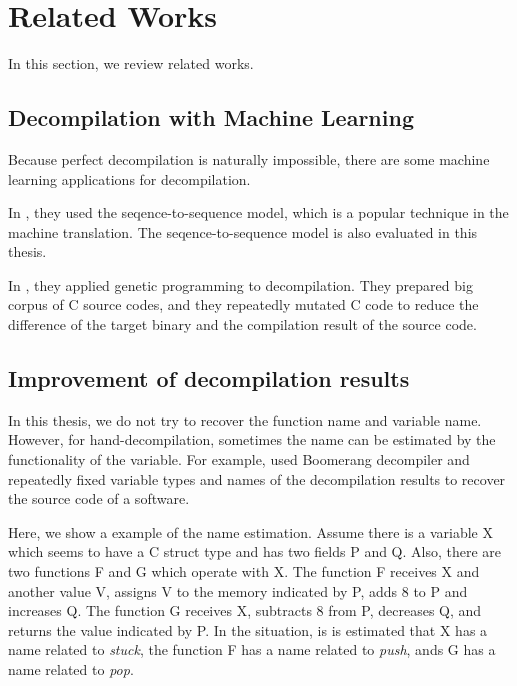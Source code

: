 \documentclass[senior,final,11pt]{iscs-thesis}
\begin{document}

\chapter{Related Works}
In this section, we review related works.

\section{Decompilation with Machine Learning}

Because perfect decompilation is naturally impossible, there are some machine learning applications for decompilation.

In \cite{Motoneta}, they used the seqence-to-sequence model, which is a popular technique in the machine translation.
The seqence-to-sequence model is also evaluated in this thesis.

In \cite{genetic_decompiler}, they applied genetic programming to decompilation.
They prepared big corpus of C source codes, and they repeatedly mutated C code to reduce the difference of the target binary and the compilation result of the source code. 



% 

\section{Improvement of decompilation results}
In this thesis, we do not try to recover the function name and variable name. 
However, for hand-decompilation, sometimes the name can be estimated by the functionality of the variable.
For example, \cite{hand_decompilation} used Boomerang decompiler and repeatedly fixed variable types and names of the decompilation results 
to recover the source code of a software.

Here, we show a example of the name estimation.
Assume there is a variable X which seems to have a C struct type and has two fields P and Q.
Also, there are two functions F and G which operate with X. 
The function F receives X and another value V, assigns V to the memory indicated by P, adds 8 to P and increases Q. 
The function G receives X, subtracts 8 from P, decreases Q, and returns the value indicated by P.
In the situation, is is estimated that X has a name related to {\sl stuck}, the function F has a name related to {\sl push},
ands G has a name related to {\sl pop}.
\end{document}
